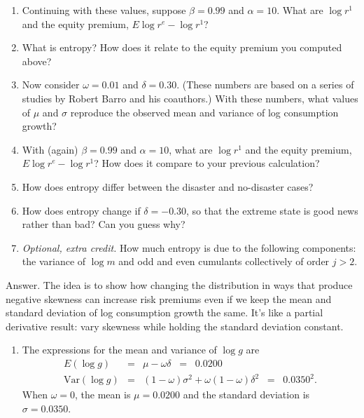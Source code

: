 \documentclass[11pt]{article}
\begin{document}
\begin{enumerate}
\begin{enumerate}
\item Continuing with these values, suppose $\beta = 0.99$ and $\alpha = 10$.
What are $\log r^1$ and
the equity premium,  $E \log r^e - \log r^1 $?

\item What is entropy?
How does it relate to the equity premium you computed above?

\item Now consider $\omega = 0.01$ and $\delta = 0.30$.
(These numbers are based on a series of studies by Robert Barro and his coauthors.)
With these numbers, what values of $\mu$ and $\sigma$ reproduce
the observed mean and variance of log consumption growth?

\item With (again) $\beta = 0.99$ and $\alpha = 10$,
what are $\log r^1$ and
the equity premium,  $E \log r^e - \log r^1 $?
How does it compare to your previous calculation?

\item How does entropy differ between the
disaster and no-disaster cases?

\item How does entropy change if $\delta = - 0.30$,
so that the extreme state is good news rather than bad?
Can you guess why?

\item {\it Optional, extra credit.\/}
How much entropy is due to the following components:
the variance of $\log m$ and odd and even cumulants collectively
of order $j>2$.
\end{enumerate}

Answer.  
The idea is to show how changing the distribution
in ways that produce negative skewness can increase risk
premiums even if we keep the mean and standard deviation of log consumption
growth the same.
It's like a partial derivative result:
vary skewness while holding the standard deviation constant.

\begin{enumerate}
\item The expressions for the mean and variance of $\log g$ are
\begin{eqnarray*}
    E (\log g)   &=&  \mu - \omega \delta \;\;=\;\; 0.0200 \\
    \mbox{Var}(\log g) &=& (1-\omega) \sigma^2 + \omega (1-\omega) \delta^2
                \;\;=\;\; 0.0350^2 .
\end{eqnarray*}
When $\omega = 0$, the mean is $\mu = 0.0200$ and the standard
deviation is $\sigma = 0.0350$.


\end{enumerate}
\end{enumerate}
\end{document}
